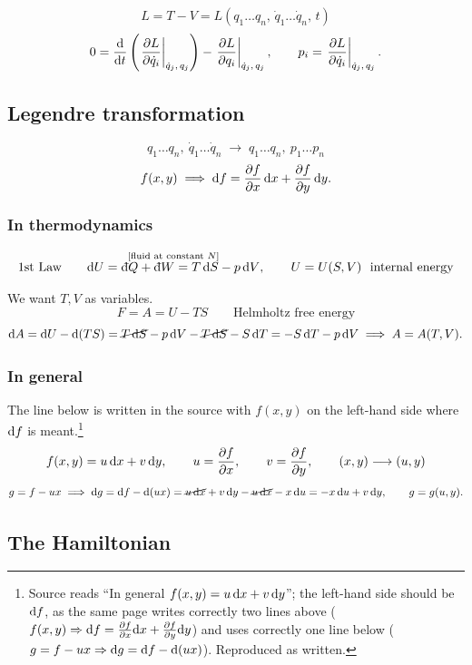 \documentclass[11pt]{article}
\begin{document}
\[
L = T - V = L(q_{1}\ldots q_{n},\,\dot q_{1}\ldots \dot q_{n},\, t)
\]
\[
0 = \frac{\mathrm{d} }{\mathrm{d} t}\left(\left.\frac{\partial L}{\partial \dot q_{i}}\right|_{\dot q_{j},\,q_{j}}\right)
  - \left.\frac{\partial L}{\partial q_{i}}\right|_{\dot q_{j},\,q_{j}},
\qquad
p_{i} = \left.\frac{\partial L}{\partial \dot q_{i}}\right|_{\dot q_{j},\,q_{j}} .
\]

\subsection*{Legendre transformation}

\[
q_{1}\ldots q_{n},\ \dot q_{1}\ldots \dot q_{n}
\;\longrightarrow\;
q_{1}\ldots q_{n},\ p_{1}\ldots p_{n}
\]
\[
f(x,y) \;\Longrightarrow\;
\mathrm{d} f = \frac{\partial f}{\partial x}\,\mathrm{d} x + \frac{\partial f}{\partial y}\,\mathrm{d} y .
\]

\subsubsection*{In thermodynamics}

\[
\text{1st Law}\qquad
\overset{\text{\scriptsize[fluid at constant $N$]}}{\d U = \,\dbar Q + \,\dbar W = T\,\d S - p\,\d V},
\qquad
U = U(S,V)\ \ \text{internal energy}
\]

We want $T,V$ as variables.
\[
F = A = U - TS \qquad \text{Helmholtz free energy}
\]
\[
\mathrm{d} A = \mathrm{d} U - \mathrm{d}(TS)
 = \cancel{T\,\mathrm{d} S} - p\,\mathrm{d} V - \cancel{T\,\mathrm{d} S} - S\,\mathrm{d} T
 = -S\,\mathrm{d} T - p\,\mathrm{d} V
\;\Longrightarrow\; A = A(T,V).
\]

\subsubsection*{In general}

The line below is written in the source with $f(x,y)$ on the left-hand side where
$\mathrm{d} f$ is meant.\footnote{Source reads ``In general $f(x,y) = u\,\mathrm{d} x + v\,\mathrm{d} y$'';
the left-hand side should be $\mathrm{d} f$, as the same page writes correctly two lines
above ($f(x,y) \Rightarrow \mathrm{d} f = \frac{\partial f}{\partial x}\mathrm{d} x + \frac{\partial f}{\partial y}\mathrm{d} y$) and uses correctly
one line below ($g = f - ux \Rightarrow \mathrm{d} g = \mathrm{d} f - \mathrm{d}(ux)$). Reproduced as written.}
\[
f(x,y) = u\,\mathrm{d} x + v\,\mathrm{d} y,
\qquad
u = \frac{\partial f}{\partial x},\qquad v = \frac{\partial f}{\partial y},
\qquad (x,y) \longrightarrow (u,y)
\]
\[
g = f - ux \;\Longrightarrow\;
\mathrm{d} g = \mathrm{d} f - \mathrm{d}(ux)
 = \cancel{u\,\mathrm{d} x} + v\,\mathrm{d} y - \cancel{u\,\mathrm{d} x} - x\,\mathrm{d} u
 = -x\,\mathrm{d} u + v\,\mathrm{d} y,
\qquad g = g(u,y).
\]

\subsection*{The Hamiltonian}
\end{document}
